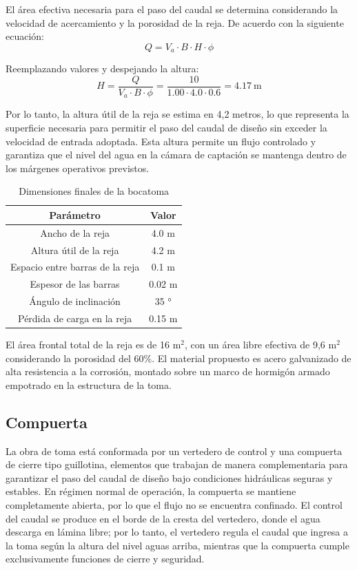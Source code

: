 \documentclass{article} %
\begin{document}
El área efectiva necesaria para el paso del caudal se determina considerando la velocidad de acercamiento y la porosidad de la reja. De acuerdo con la siguiente ecuación:
\begin{equation}
    Q = V_a \cdot B \cdot H \cdot \phi
\end{equation}

Reemplazando valores y despejando la altura:
\begin{equation}
    H = \frac{Q}{V_a \cdot B \cdot \phi} = \frac{10}{1.00 \cdot 4.0 \cdot 0.6} = 4.17 \ \text{m}
\end{equation}

Por lo tanto, la altura útil de la reja se estima en 4,2 metros, lo que representa la superficie necesaria para permitir el paso del caudal de diseño sin exceder la velocidad de entrada adoptada. Esta altura permite un flujo controlado y garantiza que el nivel del agua en la cámara de captación se mantenga dentro de los márgenes operativos previstos.

\begin{table}[h]
    \centering
    \begin{tabular}{c c}
        \textbf{Parámetro} & \textbf{Valor} \\
        \hline
        Ancho de la reja & 4.0 m \\
        Altura útil de la reja & 4.2 m \\ 
        Espacio entre barras de la reja & 0.1 m \\
        Espesor de las barras & 0.02 m \\
        Ángulo de inclinación & 35 ° \\
        Pérdida de carga en la reja & 0.15 m \\ \hline
    \end{tabular}
    \caption{Dimensiones finales de la bocatoma}
\end{table}

El área frontal total de la reja es de 16 m$^2$, con un área libre efectiva de 9,6 m$^2$ considerando la porosidad del 60\%. El material propuesto es acero galvanizado de alta resistencia a la corrosión, montado sobre un marco de hormigón armado empotrado en la estructura de la toma.

\subsection{Compuerta}

La obra de toma está conformada por un vertedero de control y una compuerta de cierre tipo guillotina, elementos que trabajan de manera complementaria para garantizar el paso del caudal de diseño bajo condiciones hidráulicas seguras y estables. En régimen normal de operación, la compuerta se mantiene completamente abierta, por lo que el flujo no se encuentra confinado. El control del caudal se produce en el borde de la cresta del vertedero, donde el agua descarga en lámina libre; por lo tanto, el vertedero regula el caudal que ingresa a la toma según la altura del nivel aguas arriba, mientras que la compuerta cumple exclusivamente funciones de cierre y seguridad.
\end{document}
